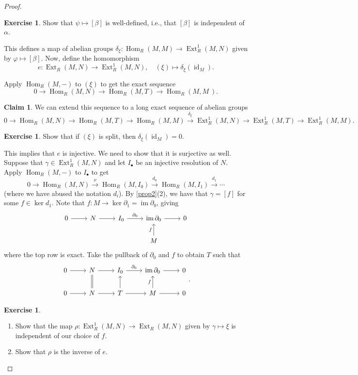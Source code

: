\documentclass[10pt,letterpaper,cm]{nupset}
\theoremstyle{definition}
\theoremstyle{theorem}
\newtheorem*{claim}{Claim}
\newtheorem{exercise}[definition]{Exercise}
\theoremstyle{remark}
\newcommand{\1}{\mathbf{1}}
\newcommand{\0}{\vec 0}
\DeclareMathOperator{\id}{id}
\DeclareMathOperator{\ext}{Ext}
\DeclareMathOperator{\im}{im}
\DeclareMathOperator{\Hom}{Hom}
\begin{document}
\begin{proof}
\begin{exercise}
Show that $\psi \mapsto [\beta]$ is well-defined, i.e., that $[\beta]$ is independent of $\alpha$. 
\end{exercise} 
This defines a map of abelian groups $\delta_{\xi}: \Hom_R(M, M) \to \ext^1_R(M, N)$ given by $\varphi \mapsto [\beta]$. Now, define the homomorphism $$e: \ext_R(M, N) \to \ext^1_R(M , N), \quad (\xi) \mapsto \delta_{\xi}(\id_M).$$

Apply $\Hom_R(M, -)$ to $(\xi)$ to get the exact sequence 
\[
0 \to \Hom_R(M, N) \to \Hom_R(M, T) \to \Hom_R(M, M\
)  . 
\]
\begin{claim}   
We can extend this sequence to a long exact sequence of abelian groups $$0 \to \Hom_R(M, N) \to \Hom_R(M, T) \to \Hom_R(M, M)  \overset{\delta_{\xi}}{\longrightarrow} \ext^1_R(M, N) \to \ext^1_R(M, T) \to \ext^1_R(M, M).$$
\end{claim}
\begin{exercise}
Show that if $(\xi)$ is split, then $\delta_{\xi}(\id_M) =0$.
\end{exercise} 
This implies that  $e$ is injective.\reversemarginpar{} We need to show that it is surjective as well. Suppose that $\gamma \in \ext_R^1(M, N)$ and let $I_{\bullet}$ be an injective resolution of $N$. Apply $\Hom_R(M, -)$ to $I_{\bullet}$ to get $$0 \to \Hom_R(M, N) \overset{\nu}{\longrightarrow} \Hom_R(M, I_0) \overset{d_0}{\longrightarrow} \Hom_R(M, I_1) \overset{d_1}{\longrightarrow} \cdots   $$ (where we have abused the notation $d_i$). 
By \cref{prop2}(2), we have that $\gamma = [f]$ for some $f\in \ker{d_1}$. Note that $f: M \to \ker{\partial_1} = \im{\partial_0}$, giving 
\[ \begin{tikzcd}
0 \arrow[r] & N \arrow[r] & I_0 \arrow[r, "\partial_0"] & \im{\partial_0} \arrow[r] & 0 \\
 &  &  & M \arrow[u, "f"] & 
\end{tikzcd}
\] where the top row is exact. Take the pullback of $\partial_0$ and $f$ to obtain $T$ such that
\[
\begin{tikzcd}
0 \arrow[r] & N \arrow[r] & I_0 \arrow[r, "\partial_0"] & \im{\partial_0} \arrow[r] & 0 \\
0 \arrow[r] & N \arrow[r] \arrow[u, equal] & T \arrow[r] \arrow[u] & M \arrow[u, "f"] \arrow[r] & 0
\end{tikzcd}
.\]
\begin{exercise} $ $
\begin{enumerate}
\item Show that the map $\rho: \ext_R^1(M, N) \to \ext_R(M, N)$ given by $\gamma \mapsto \xi$ is independent of our choice of $f$.  
\item Show that $\rho$ is the inverse of  $e$.
\end{enumerate}
\end{exercise}
\end{proof}
\end{document}
